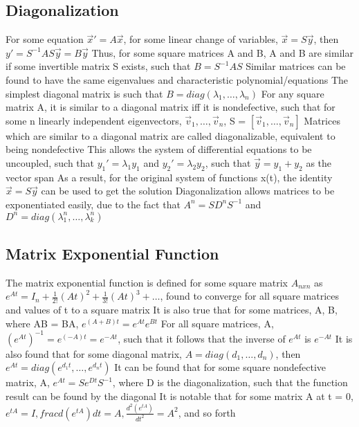 \documentclass[11 pt, twoside]{article}
\newenvironment{outline*}
{
	\begin{outline}[enumerate]
	}
	{\end{outline}
}
\begin{document}
\subsection{Diagonalization}
\begin{outline*}
\1 For some equation $\vec{x}' = A\vec{x}$, for some linear change of variables, $\vec{x} = S\vec{y}$, then $y' = S^{-1}AS\vec{y} = B\vec{y}$
\2 Thus, for some square matrices A and B, A and B are similar if  some invertible matrix S exists, such that $B = S^{-1}AS$
\2 Similar matrices can be found to have the same eigenvalues and characteristic polynomial/equations
\1 The simplest diagonal matrix is such that $B = diag(\lambda_1, \dots, \lambda_n)$
\2 For any square matrix A, it is similar to a diagonal matrix iff it is nondefective, such that for some n linearly independent eigenvectors, $\vec{v}_1, \dots, \vec{v}_n$, S = $[\vec{v}_1, \dots, \vec{v}_n]$
\2 Matrices which are similar to a diagonal matrix are called diagonalizable, equivalent to being nondefective
\2 This allows the system of differential equations to be uncoupled, such that $y_1' = \lambda_1y_1$ and $y_2' = \lambda_2 y_2$, such that $\vec{y} = y_1 + y_2$ as the vector span
\3 As a result, for the original system of functions x(t), the identity $\vec{x} = S\vec{y}$ can be used to get the solution
\2 Diagonalization allows matrices to be exponentiated easily, due to the fact that $A^n = SD^nS^{-1}$ and $D^n = diag(\lambda_1^n, \dots, \lambda_k^n)$
\end{outline*}
\subsection{Matrix Exponential Function}
\begin{outline*}
\1 The matrix exponential function is defined for some square matrix $A_{nxn}$ as $e^{At} = I_n + \frac{1}{2!}(At)^2 + \frac{1}{3!}(At)^3 + \dots$, found to converge for all square matrices and values of t to a square matrix
\2 It is also true that for some matrices, A, B, where AB = BA, $e^{(A + B)t} = e^{At}e^{Bt}$
\2 For all square matrices, A, $(e^{At})^{-1} = e^{(-A)t} = e^{-At}$, such that it follows that the inverse of $e^{At}$ is $e^{-At}$
\2 It is also found that for some diagonal matrix, $A = diag(d_1, \dots, d_n)$, then $e^{At} = diag(e^{d_1t}, \dots, e^{d_nt})$
\1 It can be found that for some square nondefective matrix, A, $e^{At} = Se^{Dt}S^{-1}$, where D is the diagonalization, such that the function result can be found by the diagonal
\1 It is notable that for some matrix A at t = 0, $e^{tA} = I, frac{d(e^{tA})}{dt} = A, \frac{d^2(e^{tA})}{dt^2} = A^2$, and so forth
\end{outline*}
\end{document}
